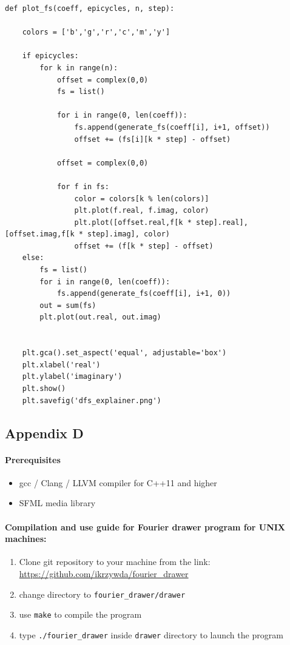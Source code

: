 \documentclass[titlepage]{article}
\begin{document}
    \begin{verbatim}
def plot_fs(coeff, epicycles, n, step):

    colors = ['b','g','r','c','m','y']

    if epicycles: 
        for k in range(n):
            offset = complex(0,0)
            fs = list()

            for i in range(0, len(coeff)):
                fs.append(generate_fs(coeff[i], i+1, offset))
                offset += (fs[i][k * step] - offset)

            offset = complex(0,0)

            for f in fs:
                color = colors[k % len(colors)]
                plt.plot(f.real, f.imag, color)
                plt.plot([offset.real,f[k * step].real], [offset.imag,f[k * step].imag], color)
                offset += (f[k * step] - offset)
    else:
        fs = list()
        for i in range(0, len(coeff)):
            fs.append(generate_fs(coeff[i], i+1, 0))
        out = sum(fs)
        plt.plot(out.real, out.imag)
        

    plt.gca().set_aspect('equal', adjustable='box')
    plt.xlabel('real')
    plt.ylabel('imaginary')
    plt.show()
    plt.savefig('dfs_explainer.png')

    \end{verbatim}

\subsection{Appendix D}

    \paragraph{Prerequisites}
    \begin{itemize}
        \item gcc / Clang / LLVM compiler for C++11 and higher
        \item SFML media library
    \end{itemize}

    \paragraph{Compilation and use guide for Fourier drawer program for UNIX machines:}
    \begin{enumerate}
        \item Clone git repository to your machine from the link:
            \url{https://github.com/ikrzywda/fourier\_drawer}
        \item change directory to \texttt{fourier\_drawer/drawer}
        \item use \texttt{make} to compile the program
        \item type \texttt{./fourier\_drawer} inside \texttt{drawer} directory to launch
            the program
    \end{enumerate}
\end{document}
